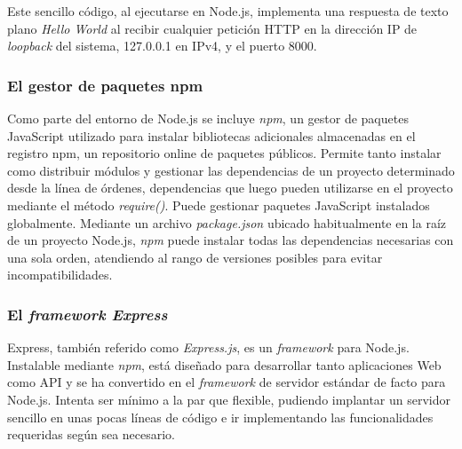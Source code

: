 
Este sencillo código, al ejecutarse en Node.js, implementa una respuesta de texto plano \emph{Hello World} al recibir cualquier petición HTTP en la dirección IP de \emph{loopback} del sistema, 127.0.0.1 en IPv4, y el puerto 8000.

\subsubsection{El gestor de paquetes npm}

Como parte del entorno de Node.js se incluye \emph{npm}, un gestor de paquetes JavaScript utilizado para instalar bibliotecas adicionales almacenadas en el registro npm, un repositorio online de paquetes públicos. 
Permite tanto instalar como distribuir módulos y gestionar las dependencias de un proyecto determinado desde la línea de órdenes, dependencias que luego pueden utilizarse en el proyecto mediante el método \emph{require()}. 
Puede gestionar paquetes JavaScript instalados globalmente. Mediante un archivo \emph{package.json} ubicado habitualmente en la raíz de un proyecto Node.js, \emph{npm} puede instalar todas las dependencias necesarias con una sola orden, atendiendo al rango de versiones posibles para evitar incompatibilidades.

\subsubsection{El \emph{framework Express}}
Express, también referido como \emph{Express.js}, es un \emph{framework} para Node.js. Instalable mediante \emph{npm}, está diseñado para desarrollar tanto aplicaciones Web como API y se ha convertido en el \emph{framework} de servidor estándar de facto para Node.js. Intenta ser mínimo a la par que flexible, pudiendo implantar un servidor sencillo en unas pocas líneas de código e ir implementando las funcionalidades requeridas según sea necesario.

